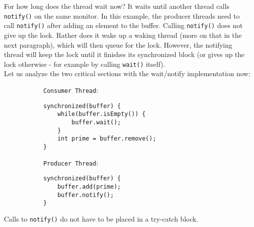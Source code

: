 \documentclass[main.tex]{subfiles}
\begin{document}

For how long does the thread wait now? It waits until another thread calls \texttt{notify()} on the same monitor. In this example, the producer threads need to call \texttt{notify()} after adding an element to the buffer. Calling \texttt{notify()} does not give up the lock. Rather does it wake up a waking thread (more on that in the next paragraph), which will then queue for the lock. However, the notifying thread will keep the lock until it finishes its synchronized block (or gives up the lock otherwise - for example by calling \texttt{wait()} itself).\\
Let us analyze the two critical sections with the wait/notify implementation now:
\begin{figure}[H] \begin{subfigure}[t]{.52\textwidth}
        \texttt{Consumer Thread}:
        \begin{verbatim}
synchronized(buffer) {
    while(buffer.isEmpty()) {
        buffer.wait();
    }
    int prime = buffer.remove();
}
        \end{verbatim}
    \end{subfigure}%
    \begin{subfigure}[t]{.52\textwidth}
        \texttt{Producer Thread}:
        \begin{verbatim}
synchronized(buffer) {
    buffer.add(prime);
    buffer.notify();
}
        \end{verbatim}
    \end{subfigure}
\end{figure}
Calls to \texttt{notify()} do not have to be placed in a try-catch block.

\end{document}
